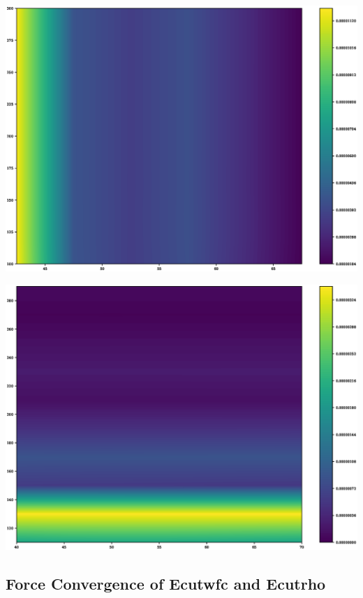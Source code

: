 \begin{center}
\includegraphics[scale=0.35]{appendix/dft_calibration/al/ecut2d_energy_wfcconv_ry_colour}
\end{center}

\begin{center}
\includegraphics[scale=0.35]{appendix/dft_calibration/al/ecut2d_energy_rhoconv_ry_colour}
\end{center}

\FloatBarrier
\subsection{Force Convergence of Ecutwfc and Ecutrho}

